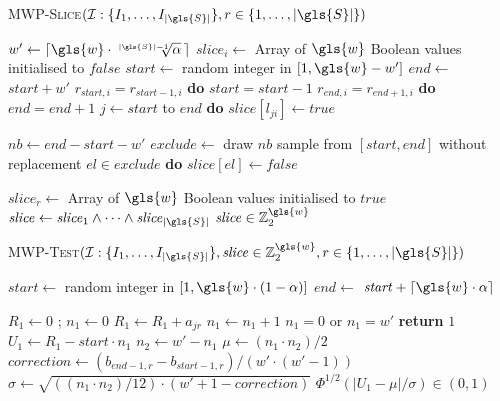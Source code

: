 \begin{algorithm}[ht]\footnotesize
	\caption{\textsc{\gls{MWP}-Slice}{$(\mathcal{I}: \{I_1, \dots, I_{|\gls{S}|} \}, r \in \{1,\dots,|\gls{S}|\})$}}\label{mwpslice} 
	\begin{algorithmic}[1]
		\State $w' \gets \left \lceil \gls{w} \cdot \sqrt[|\gls{S}|-1]{\alpha}\,  \right \rceil  $
		\State $\mathit{slice}_i \gets$ Array of $\gls{w}$ Boolean values initialised to $\mathit{false}$
		\State $\mathit{start} \gets$ random integer in $[1,\gls{w}-w']$
		\State $\mathit{end} \gets$ $\mathit{start} + w'$
		 $r_{\mathit{start},i} = r_{\mathit{start}-1,i}$ {\bfseries do} $\mathit{start} = \mathit{start} -1$
		 $r_{\mathit{end},i} = r_{\mathit{end}+1,i}$ {\bfseries do} $\mathit{end} = \mathit{end} + 1$
		 $j \gets \mathit{start}$ to $\mathit{end}$  {\bfseries do} $\mathit{slice}[l_{ji}] \gets \mathit{true}$
		
		\State $nb \gets \mathit{end} - \mathit{start} - w'$
		\State $\mathit{exclude} \gets$ draw $nb$ sample from $[\mathit{start}, \mathit{end}]$ without replacement
		 $el \in \mathit{exclude}$ {\bfseries do} $\mathit{slice}[el] \gets \mathit{false}$
		\EndIf
		
		\EndFor
		\State $\mathit{slice}_r \gets$ Array of $\gls{w}$ Boolean values initialised to $\mathit{true}$
		\State $\mathit{slice} \gets \mathit{slice}_1 \wedge \dots \wedge \mathit{slice}_{|\gls{S}|}$
		 $\mathit{slice} \in \mathbb{Z}_2^{\gls{w}}$
	\end{algorithmic}
\end{algorithm}

\begin{algorithm}[ht]\footnotesize
	\caption{\textsc{\gls{MWP}-Test}{$( \mathcal{I}: \{I_1, \dots, I_{|\gls{S}|} \}, \mathit{slice} \in \mathbb{Z}_2^{\gls{w}}, r \in \{1,\dots,|\gls{S}|\})$}}\label{TMWP}
	\begin{algorithmic}[1]
		\State $\mathit{start} \gets$ random integer in $[1,\gls{w} \cdot (1-\alpha)]$ 
		\State $\mathit{end} \gets$ $\mathit{start} + \left \lceil \gls{w} \cdot \alpha \right \rceil$
		
		\State $R_1 \gets 0$ ; $n_1 \gets 0$
		\State $R_1 \gets R_1 + a_{jr}$ 
		\State $n_1 \gets n_1 + 1$
		\EndIf
		\EndFor
		 $n_1 = 0$ or $n_1 = w'$ {\bfseries return} $1$
		\State $U_1 \gets R_1 - \mathit{start} \cdot n_1$   \label{adjustranks}
		\State $n_2 \gets w' - n_1$
		\State $\mu \gets (n_1 \cdot n_2)/ 2$
		\State $\mathit{correction} \gets (b_{\mathit{end}-1,r}-b_{\mathit{start}-1,r})/(w'\cdot (w'-1))$ \label{corrects}
		\State $\sigma \gets \sqrt{((n_1 \cdot n_2)/12) \cdot {(w'+1-\mathit{correction})}}$ \label{tieshandling}
		  $\Phi^{1/2}(|U_1 - \mu| / \sigma) \in (0,1)$
	\end{algorithmic}
\end{algorithm}

